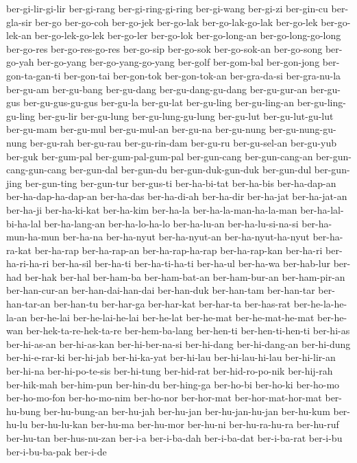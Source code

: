 {ber-gi-lir-gi-lir ber-gi-rang ber-gi-ring-gi-ring ber-gi-wang ber-gi-zi
ber-gin-cu ber-gla-sir ber-go ber-go-coh ber-go-jek ber-go-lak
ber-go-lak-go-lak ber-go-lek ber-go-lek-an ber-go-lek-go-lek ber-go-ler
ber-go-lok ber-go-long-an ber-go-long-go-long ber-go-res ber-go-res-go-res
ber-go-sip ber-go-sok ber-go-sok-an ber-go-song ber-go-yah ber-go-yang
ber-go-yang-go-yang ber-golf ber-gom-bal ber-gon-jong ber-gon-ta-gan-ti
ber-gon-tai ber-gon-tok ber-gon-tok-an ber-gra-da-si ber-gra-nu-la
ber-gu-am ber-gu-bang ber-gu-dang ber-gu-dang-gu-dang ber-gu-gur-an
ber-gu-gus ber-gu-gus-gu-gus ber-gu-la ber-gu-lat ber-gu-ling
ber-gu-ling-an ber-gu-ling-gu-ling ber-gu-lir ber-gu-lung
ber-gu-lung-gu-lung ber-gu-lut ber-gu-lut-gu-lut ber-gu-mam ber-gu-mul
ber-gu-mul-an ber-gu-na ber-gu-nung ber-gu-nung-gu-nung ber-gu-rah
ber-gu-rau ber-gu-rin-dam ber-gu-ru ber-gu-sel-an ber-gu-yub ber-guk
ber-gum-pal ber-gum-pal-gum-pal ber-gun-cang ber-gun-cang-an
ber-gun-cang-gun-cang ber-gun-dal ber-gun-du ber-gun-duk-gun-duk
ber-gun-dul ber-gun-jing ber-gun-ting ber-gun-tur ber-gus-ti ber-ha-bi-tat
ber-ha-bis ber-ha-dap-an ber-ha-dap-ha-dap-an ber-ha-das ber-ha-di-ah
ber-ha-dir ber-ha-jat ber-ha-jat-an ber-ha-ji ber-ha-ki-kat ber-ha-kim
ber-ha-la ber-ha-la-man-ha-la-man ber-ha-lal-bi-ha-lal ber-ha-lang-an
ber-ha-lo-ha-lo ber-ha-lu-an ber-ha-lu-si-na-si ber-ha-mun-ha-mun
ber-ha-na ber-ha-nyut ber-ha-nyut-an ber-ha-nyut-ha-nyut ber-ha-ra-kat
ber-ha-rap ber-ha-rap-an ber-ha-rap-ha-rap ber-ha-rap-kan ber-ha-ri
ber-ha-ri-ha-ri ber-ha-sil ber-ha-ti ber-ha-ti-ha-ti ber-ha-ul ber-ha-wa
ber-hab-lur ber-had ber-hak ber-hal ber-ham-ba ber-ham-bat-an
ber-ham-bur-an ber-ham-pir-an ber-han-cur-an ber-han-dai-han-dai
ber-han-duk ber-han-tam ber-han-tar ber-han-tar-an ber-han-tu ber-har-ga
ber-har-kat ber-har-ta ber-has-rat ber-he-la-he-la-an ber-he-lai
ber-he-lai-he-lai ber-he-lat ber-he-mat ber-he-mat-he-mat ber-he-wan
ber-hek-ta-re-hek-ta-re ber-hem-ba-lang ber-hen-ti ber-hen-ti-hen-ti
ber-hi-as ber-hi-as-an ber-hi-as-kan ber-hi-ber-na-si ber-hi-dang
ber-hi-dang-an ber-hi-dung ber-hi-e-rar-ki ber-hi-jab ber-hi-ka-yat
ber-hi-lau ber-hi-lau-hi-lau ber-hi-lir-an ber-hi-na ber-hi-po-te-sis
ber-hi-tung ber-hid-rat ber-hid-ro-po-nik ber-hij-rah ber-hik-mah
ber-him-pun ber-hin-du ber-hing-ga ber-ho-bi ber-ho-ki ber-ho-mo
ber-ho-mo-fon ber-ho-mo-nim ber-ho-nor ber-hor-mat ber-hor-mat-hor-mat
ber-hu-bung ber-hu-bung-an ber-hu-jah ber-hu-jan ber-hu-jan-hu-jan
ber-hu-kum ber-hu-lu ber-hu-lu-kan ber-hu-ma ber-hu-mor ber-hu-ni
ber-hu-ra-hu-ra ber-hu-ruf ber-hu-tan ber-hus-nu-zan ber-i-a ber-i-ba-dah
ber-i-ba-dat ber-i-ba-rat ber-i-bu ber-i-bu-ba-pak ber-i-de
}
